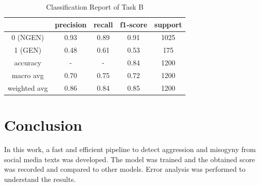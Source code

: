 \documentclass[conference]{IEEEtran}
\begin{document}
\begin{table}[t]
\caption{Classification Report of Task B}
\label{table:tab-7}
\centering
    \begin{tabular}{|c|c|c|c|c|}
        \hline
        \textbf{ } & \textbf{precision} & \textbf{recall} & \textbf{f1-score}  & \textbf{support}\\
        \hline
        0 (NGEN) & 0.93 & 0.89 & 0.91 & 1025   \\
        1 (GEN) & 0.48 & 0.61 & 0.53 & 175   \\
        accuracy & - & - & 0.84 & 1200 \\
   macro avg & 0.70 & 0.75 & 0.72 & 1200 \\ 
weighted avg & 0.86 & 0.84 & 0.85 & 1200 \\
        \hline
    \end{tabular}
\end{table}

\section{Conclusion}
In this work, a fast and efficient pipeline to detect aggression and misogyny from social media texts was developed. The model was trained and the obtained score was recorded and compared to other models. Error analysis was performed to understand the results. 



{}
\end{document}
